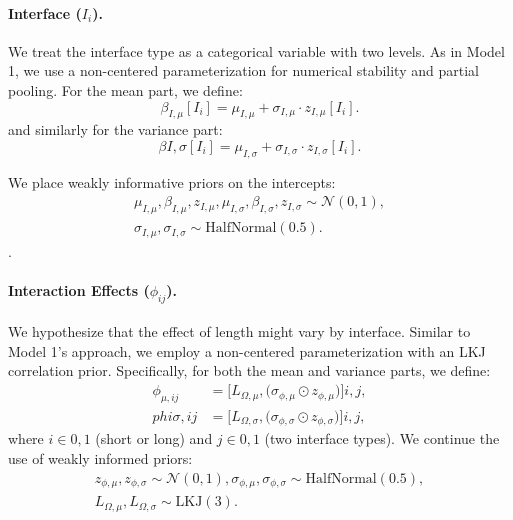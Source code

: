 \paragraph{Interface ($I_i$).} We treat the interface type as a categorical variable with two levels. As in Model 1, we use a non-centered parameterization for numerical stability and partial pooling. For the mean part, we define: \begin{equation}\label{eq:distance_model_2_beta_I_mu} 
\beta_{I,\mu}[I_i] = \mu_{I,\mu} + \sigma_{I,\mu} \cdot z_{I,\mu}[I_i].
\end{equation} and similarly for the variance part: 
\begin{equation}\label{eq:distance_model_2_beta_I_sigma} 
\beta{I,\sigma}[I_i] = \mu_{I,\sigma} + \sigma_{I,\sigma} \cdot z_{I,\sigma}[I_i].
\end{equation} 

\noindent We place weakly informative priors on the intercepts:
\begin{align}
\mu_{I,\mu}, \beta_{I,\mu}, z_{I,\mu}, \mu_{I,\sigma}, \beta_{I,\sigma}, z_{I,\sigma} \sim \mathcal{N}(0, 1),\\
\sigma_{I,\mu}, \sigma_{I,\sigma} \sim \text{HalfNormal}(0.5).
\end{align}.

\paragraph{Interaction Effects ($\phi_{ij}$).} We hypothesize that the effect of length might vary by interface. Similar to Model 1’s approach, we employ a non-centered parameterization with an LKJ correlation prior. Specifically, for both the mean and variance parts, we define: 
\begin{align} 
\phi_{\mu,ij} &= \bigl[L_{\Omega,\mu},\bigl(\sigma_{\phi,\mu} \odot z_{\phi,\mu}\bigr)\bigr]{i,j}, \label{eq:distance_model_2_phi_mu} \\
phi{\sigma,ij} &= \bigl[L_{\Omega,\sigma},\bigl(\sigma_{\phi,\sigma} \odot z_{\phi,\sigma}\bigr)\bigr]{i,j}, \label{eq:distance_model_2_phi_sigma} 
\end{align} 
where $i \in {0,1}$ (short or long) and $j \in {0,1}$ (two interface types). We continue the use of weakly informed priors:
\begin{align}
z_{\phi,\mu}, z_{\phi,\sigma} \sim \mathcal{N}(0, 1), \sigma_{\phi,\mu}, \sigma_{\phi,\sigma} \sim \text{HalfNormal}(0.5),\\
L_{\Omega,\mu}, L_{\Omega,\sigma} \sim \text{LKJ}(3).
\end{align}

